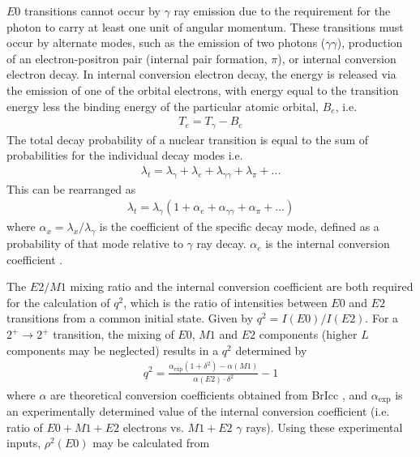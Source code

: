 \documentclass[twocolumn,preprintnumbers,amsmath,amssymb]{revtex4}
\begin{document}
$E0$ transitions cannot occur by $\gamma$ ray emission due to the requirement for the photon to carry at least one unit of angular momentum. These transitions must occur by alternate modes, such as the emission of two photons ($\gamma \gamma$), production of an electron-positron pair (internal pair formation, $\pi$), or internal conversion electron decay.
In internal conversion electron decay, the energy is released via the emission of one of the orbital electrons, with energy equal to the transition energy less the binding energy of the particular atomic orbital, $B_e$, i.e.
\begin{gather}
T_e = T_\gamma - B_e
\label{iceEnergy}
\end{gather}
The total decay probability of a nuclear transition is equal to the sum of probabilities for the individual decay modes i.e.
\begin{gather}
\lambda_t = \lambda_\gamma + \lambda_e + \lambda_{\gamma \gamma} + \lambda_\pi +...
\label{totalDecay}
\end{gather}
This can be rearranged as
\begin{gather}
\lambda_t = \lambda_\gamma(1+\alpha_e+\alpha_{\gamma \gamma}+ \alpha_\pi+...)
\label{iceCoeff}
\end{gather}
where $\alpha_x=\lambda_x/\lambda_\gamma$ is the coefficient of the specific decay mode, defined as a probability of that mode relative to $\gamma$ ray decay. $\alpha_e$ is the internal conversion coefficient \cite{evitts_4}.

The $E2/M1$ mixing ratio and the internal conversion coefficient are both required for the calculation of $q^2$, which is the ratio of intensities between $E0$ and $E2$ transitions from a common initial state. Given by $q^2 = I(E0)/I(E2)$. For a $2^+\rightarrow2^+$ transition, the mixing of $E0$, $M1$ and $E2$ components (higher $L$ components may be neglected) results in a $q^2$ determined by
\begin{gather}
q^2 = \frac{\alpha_\mathrm{exp}(1+\delta^2)-\alpha(M1)}{\alpha(E2)\cdot \delta^2}-1
\label{qSquared}
\end{gather}
where $\alpha$ are theoretical conversion coefficients obtained from BrIcc \cite{evitts_86_BrIcc}, and $\alpha_\mathrm{exp}$ is an experimentally determined value of the internal conversion coefficient (i.e. ratio of $E0+M1+E2$ electrons vs. $M1+E2$ $\gamma$ rays). Using these experimental inputs, $\rho^2(E0)$ may be calculated from
\end{document}
